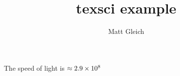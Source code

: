 \documentclass{report}
\title{texsci example}
\author{Matt Gleich}
\date{}
\begin{document}
    \maketitle

    The speed of light is $ \approx 2.9 \times 10^{8} $
\end{document}
